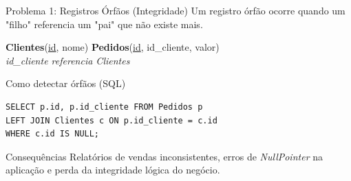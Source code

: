\documentclass[9pt]{beamer}
\begin{document}
\begin{frame}[fragile]{Problema 1: Registros Órfãos (Integridade)}
  \small
  Um registro órfão ocorre quando um "filho" referencia um "pai" que não existe mais.
  \vspace{0.2cm}
  \centering
  \centering\scriptsize
  \textbf{Clientes}(\underline{id}, nome) \quad \textbf{Pedidos}(\underline{id}, \color{red}id\_cliente\color{black}, valor) \\
  \textit{id\_cliente referencia Clientes}
  \vspace{0.1cm}
  \begin{exampleblock}{Como detectar órfãos (SQL)}
\begin{lstlisting}
SELECT p.id, p.id_cliente FROM Pedidos p
LEFT JOIN Clientes c ON p.id_cliente = c.id
WHERE c.id IS NULL;
\end{lstlisting}
  \end{exampleblock}
  \begin{alertblock}{Consequências}
    Relatórios de vendas inconsistentes, erros de \textit{NullPointer} na aplicação e perda da integridade lógica do negócio.
  \end{alertblock}
\end{frame}
\end{document}
